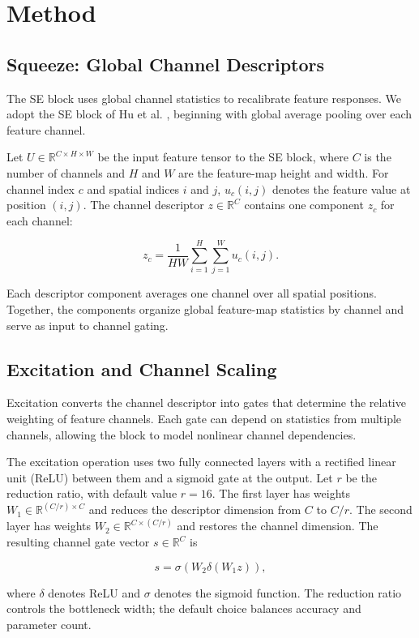 \section{Method}

\subsection{Squeeze: Global Channel Descriptors}

The SE block uses global channel statistics to recalibrate feature responses. We adopt the SE block of Hu et al. \cite{hu2018squeeze}, beginning with global average pooling over each feature channel.

Let $U\in\mathbb{R}^{C\times H\times W}$ be the input feature tensor to the SE block, where $C$ is the number of channels and $H$ and $W$ are the feature-map height and width. For channel index $c$ and spatial indices $i$ and $j$, $u_c(i,j)$ denotes the feature value at position $(i,j)$. The channel descriptor $z\in\mathbb{R}^{C}$ contains one component $z_c$ for each channel:

\[
z_c=\frac{1}{HW}\sum_{i=1}^{H}\sum_{j=1}^{W}u_c(i,j).
\]

Each descriptor component averages one channel over all spatial positions. Together, the components organize global feature-map statistics by channel and serve as input to channel gating.

\subsection{Excitation and Channel Scaling}

Excitation converts the channel descriptor into gates that determine the relative weighting of feature channels. Each gate can depend on statistics from multiple channels, allowing the block to model nonlinear channel dependencies.

The excitation operation uses two fully connected layers with a rectified linear unit (ReLU) between them and a sigmoid gate at the output. Let $r$ be the reduction ratio, with default value $r=16$. The first layer has weights $W_1\in\mathbb{R}^{(C/r)\times C}$ and reduces the descriptor dimension from $C$ to $C/r$. The second layer has weights $W_2\in\mathbb{R}^{C\times(C/r)}$ and restores the channel dimension. The resulting channel gate vector $s\in\mathbb{R}^{C}$ is

\[
s=\sigma\!\left(W_2\delta(W_1z)\right),
\]

where $\delta$ denotes ReLU and $\sigma$ denotes the sigmoid function. The reduction ratio controls the bottleneck width; the default choice balances accuracy and parameter count.


